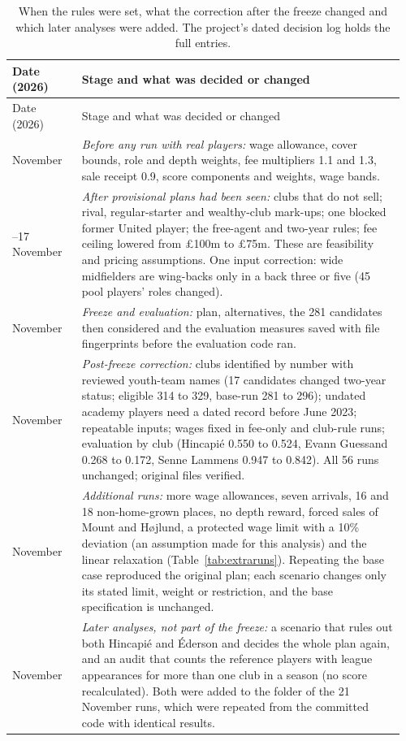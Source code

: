 {
\begin{longtable}{@{}>{\raggedright\arraybackslash}p{0.17\linewidth} >{\raggedright\arraybackslash}p{0.79\linewidth}@{}}
\caption{When the rules were set, what the correction after the freeze changed and which later analyses were added. The project's dated decision log holds the full entries.}\label{tab:history}\\
\toprule
Date (2026) & Stage and what was decided or changed \\
\midrule
\endfirsthead
\toprule
Date (2026) & Stage and what was decided or changed \\
\midrule
\endhead
\bottomrule
\endlastfoot
16 November & \emph{Before any run with real players:} wage allowance, cover bounds, role and depth weights, fee multipliers 1.1 and 1.3, sale receipt 0.9, score components and weights, wage bands. \\
16--17 November & \emph{After provisional plans had been seen:} clubs that do not sell; rival, regular-starter and wealthy-club mark-ups; one blocked former United player; the free-agent and two-year rules; fee ceiling lowered from \pounds 100m to \pounds 75m. These are feasibility and pricing assumptions. One input correction: wide midfielders are wing-backs only in a back three or five (45 pool players' roles changed). \\
17 November & \emph{Freeze and evaluation:} plan, alternatives, the 281 candidates then considered and the evaluation measures saved with file fingerprints before the evaluation code ran. \\
18 November & \emph{Post-freeze correction:} clubs identified by number with reviewed youth-team names (17 candidates changed two-year status; eligible 314 to 329, base-run 281 to 296); undated academy players need a dated record before June 2023; repeatable inputs; wages fixed in fee-only and club-rule runs; evaluation by club (Hincapié 0.550 to 0.524, Evann Guessand 0.268 to 0.172, Senne Lammens 0.947 to 0.842). All 56 runs unchanged; original files verified. \\
21 November & \emph{Additional runs:} more wage allowances, seven arrivals, 16 and 18 non-home-grown places, no depth reward, forced sales of Mount and Højlund, a protected wage limit with a 10\% deviation (an assumption made for this analysis) and the linear relaxation (Table~\ref{tab:extraruns}). Repeating the base case reproduced the original plan; each scenario changes only its stated limit, weight or restriction, and the base specification is unchanged. \\
22 November & \emph{Later analyses, not part of the freeze:} a scenario that rules out both Hincapié and Éderson and decides the whole plan again, and an audit that counts the reference players with league appearances for more than one club in a season (no score recalculated). Both were added to the folder of the 21 November runs, which were repeated from the committed code with identical results. \\
\end{longtable}}

\FloatBarrier
